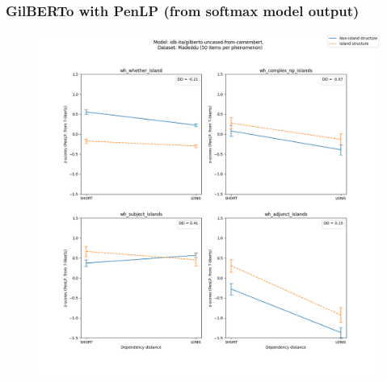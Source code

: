 \subsubsection{GilBERTo with PenLP (from softmax model output)}
\begin{figure}[h]
	\centering
	\includegraphics[width=1\textwidth]{images/Chapter1/Madeddu_wh_idb-ita_gilberto-uncased-from-camembert_PenLP-zscores-likert-2022-07-11.png} 
\end{figure}

\clearpage
